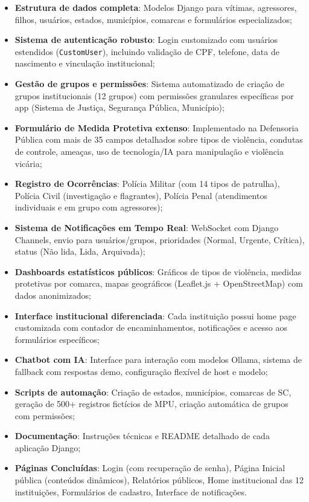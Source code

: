 \begin{itemize}
    \item \textbf{Estrutura de dados completa}: Modelos Django para vítimas, agressores, filhos, usuários, estados, municípios, comarcas e formulários especializados;
    
    \item \textbf{Sistema de autenticação robusto}: Login customizado com usuários estendidos (\texttt{CustomUser}), incluindo validação de CPF, telefone, data de nascimento e vinculação institucional;
    
    \item \textbf{Gestão de grupos e permissões}: Sistema automatizado de criação de grupos institucionais (12 grupos) com permissões granulares específicas por app (Sistema de Justiça, Segurança Pública, Município);
    
    \item \textbf{Formulário de Medida Protetiva extenso}: Implementado na Defensoria Pública com mais de 35 campos detalhados sobre tipos de violência, condutas de controle, ameaças, uso de tecnologia/IA para manipulação e violência vicária;
    
    \item \textbf{Registro de Ocorrências}: Polícia Militar (com 14 tipos de patrulha), Polícia Civil (investigação e flagrantes), Polícia Penal (atendimentos individuais e em grupo com agressores);
    
    \item \textbf{Sistema de Notificações em Tempo Real}: WebSocket com Django Channels, envio para usuários/grupos, prioridades (Normal, Urgente, Crítica), status (Não lida, Lida, Arquivada);
    
    \item \textbf{Dashboards estatísticos públicos}: Gráficos de tipos de violência, medidas protetivas por comarca, mapas geográficos (Leaflet.js + OpenStreetMap) com dados anonimizados;
    
    \item \textbf{Interface institucional diferenciada}: Cada instituição possui home page customizada com contador de encaminhamentos, notificações e acesso aos formulários específicos;
    
    \item \textbf{Chatbot com IA}: Interface para interação com modelos Ollama, sistema de fallback com respostas demo, configuração flexível de host e modelo;
    
    \item \textbf{Scripts de automação}: Criação de estados, municípios, comarcas de SC, geração de 500+ registros fictícios de MPU, criação automática de grupos com permissões;
    
    \item \textbf{Documentação}: Instruções técnicas e README detalhado de cada aplicação Django;
    
    \item \textbf{Páginas Concluídas}: Login (com recuperação de senha), Página Inicial pública (conteúdos dinâmicos), Relatórios públicos, Home institucional das 12 instituições, Formulários de cadastro, Interface de notificações.
\end{itemize}

